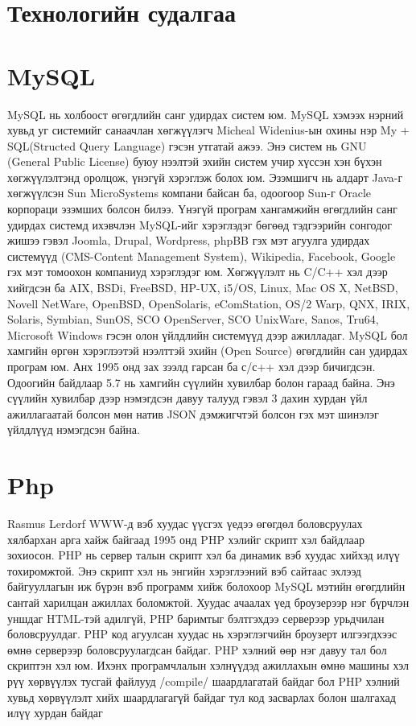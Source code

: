\section{Технологийн судалгаа}

\section{MySQL}
MySQL нь холбоост өгөгдлийн санг удирдах систем юм. MySQL хэмээх нэрний хувьд уг системийг санаачлан хөгжүүлэгч Micheal Widenius-ын охины нэр My + SQL(Structed Query Language) гэсэн утгатай ажээ.
Энэ систем нь GNU (General Public License) буюу нээлтэй эхийн систем учир хүссэн хэн бүхэн хөгжүүлэлтэнд оролцож, үнэгүй хэрэглэж болох юм. Эзэмшигч нь алдарт Java-г хөгжүүлсэн Sun MicroSystems компани байсан ба, одоогоор Sun-г Oracle корпораци эзэмших болсон билээ.
Үнэгүй програм хангамжийн өгөгдлийн санг удирдах системд ихэвчлэн MySQL-ийг хэрэглэдэг бөгөөд тэдгээрийн сонгодог жишээ гэвэл Joomla, Drupal, Wordpress, phpBB гэх мэт агуулга удирдах системүүд (CMS-Content Management System), Wikipedia, Facebook, Google гэх мэт томоохон компаниуд хэрэглэдэг юм.
Хөгжүүлэлт нь C/C++ хэл дээр хийгдсэн ба AIX, BSDi, FreeBSD, HP-UX, i5/OS, Linux, Mac OS X, NetBSD, Novell NetWare, OpenBSD, OpenSolaris, eComStation, OS/2 Warp, QNX, IRIX, Solaris, Symbian, SunOS, SCO OpenServer, SCO UnixWare, Sanos, Tru64, Microsoft Windows гэсэн олон үйлдлийн системүүд дээр ажилладаг.
MySQL бол хамгийн өргөн хэрэглээтэй нээлттэй эхийн (Open Source) өгөгдлийн сан удирдах програм юм. Анх 1995 онд зах зээлд гарсан ба с/с++ хэл дээр бичигдсэн. Одоогийн байдлаар 5.7 нь хамгийн сүүлийн хувилбар болон гараад байна. Энэ сүүлийн хувилбар дээр нэмэгдсэн давуу талууд гэвэл 3 дахин хурдан үйл ажиллагаатай болсон мөн натив JSON дэмжигчтэй болсон гэх мэт шинэлэг үйлдлүүд нэмэгдсэн байна.

\section{Php}
  Rasmus Lerdorf WWW-д вэб хуудас үүсгэх үедээ өгөгдөл боловсруулах хялбархан арга хайж байгаад 1995 онд PHP хэлийг скрипт хэл байдлаар зохиосон.
PHP нь сервер талын скрипт хэл ба динамик вэб хуудас хийхэд илүү тохиромжтой. Энэ скрипт хэл нь энгийн хэрэглээний вэб сайтаас эхлээд байгууллагын иж бүрэн вэб программ хийж болохоор MySQL мэтийн өгөгдлийн сантай харилцан ажиллах боломжтой.
Хуудас ачаалах үед броузерээр нэг бүрчлэн уншдаг HTML-тэй адилгүй, PHP баримтыг бэлтгэхдээ серверээр урьдчилан боловсруулдаг. PHP код агуулсан хуудас нь хэрэглэгчийн броузерт илгээгдхээс өмнө серверээр боловсруулагдсан байдаг.
PHP хэлний өөр нэг давуу тал бол скриптэн хэл юм. Ихэнх програмчлалын хэлнүүдэд ажиллахын өмнө машины хэл рүү хөрвүүлэх тусгай файлууд /compile/ шаардлагатай байдаг бол PHP хэлний хувьд хөрвүүлэлт хийх шаардлагагүй байдаг тул код засварлах болон шалгахад илүү хурдан байдаг

